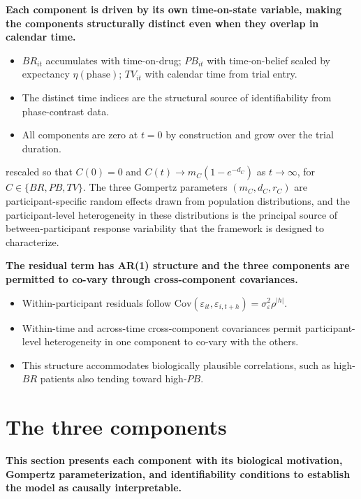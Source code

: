 \documentclass[
  11pt,
]{article}
\begin{document}
\textbf{Each component is driven by its own time-on-state variable, making the components structurally distinct even when they overlap in calendar time.}

\begin{itemize}\setlength{\itemsep}{2pt}\setlength{\parskip}{0pt}
\item $BR_{it}$ accumulates with time-on-drug; $PB_{it}$ with time-on-belief scaled by expectancy $\eta(\text{phase})$; $TV_{it}$ with calendar time from trial entry.
\item The distinct time indices are the structural source of identifiability from phase-contrast data.
\item All components are zero at $t = 0$ by construction and grow over the trial duration.
\end{itemize}

rescaled so that \(C(0) = 0\) and \(C(t) \to m_C(1 - e^{-d_C})\) as
\(t \to \infty\), for \(C \in \{BR, PB, TV\}\). The three Gompertz
parameters \((m_C, d_C, r_C)\) are participant-specific random
effects drawn from population distributions, and the
participant-level heterogeneity in these distributions is the
principal source of between-participant response variability that the
framework is designed to characterize.

\textbf{The residual term has AR(1) structure and the three components are permitted to co-vary through cross-component covariances.}

\begin{itemize}\setlength{\itemsep}{2pt}\setlength{\parskip}{0pt}
\item Within-participant residuals follow $\mathrm{Cov}(\varepsilon_{it}, \varepsilon_{i,t+h}) = \sigma^2_\varepsilon \rho^{|h|}$.
\item Within-time and across-time cross-component covariances permit participant-level heterogeneity in one component to co-vary with the others.
\item This structure accommodates biologically plausible correlations, such as high-$BR$ patients also tending toward high-$PB$.
\end{itemize}

\section{The three components}\label{the-three-components}

\textbf{This section presents each component with its biological motivation, Gompertz parameterization, and identifiability conditions to establish the model as causally interpretable.}
\end{document}
